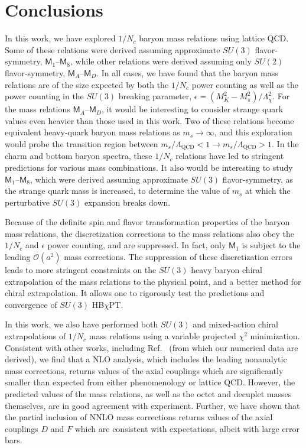 \documentclass[twocolumn,nofootinbib,prd,aps,superscriptaddress,tightenlines]{revtex4}
\def\mreln{ \mathsf{M} }
\def\mc#1{{\mathcal{#1}}}
\def\L{\Lambda}
\begin{document}
%
\section{Conclusions}
%
In this work, we have explored $1/N_c$ baryon mass relations using lattice QCD.  Some of these relations were derived assuming approximate $SU(3)$ flavor-symmetry, $\mreln_1$--$\mreln_8$, while other relations were derived assuming  only $SU(2)$ flavor-symmetry, $\mreln_A$--$\mreln_D$.  In all cases, we have found that the baryon mass relations are of the size expected by both the $1/N_c$ power counting as well as the power counting in the $SU(3)$ breaking parameter, $\epsilon = (M_K^2 - M_\pi^2) / \L_\chi^2$.  For the mass relations $\mreln_A$--$\mreln_D$, it would be interesting to consider strange quark values even heavier than those used in this work.  Two of these relations become equivalent heavy-quark baryon mass relations as $m_s \rightarrow \infty$, and this exploration would probe the transition region between $m_s / \L_{\text{QCD}}  < 1 \longrightarrow m_s / \L_{\text{QCD}} > 1$.  In the charm and bottom baryon spectra, these $1/N_c$ relations have led to stringent predictions for various mass combinations.  It also would be interesting to study $\mreln_1$--$\mreln_8$, which were derived assuming approximate $SU(3)$ flavor-symmetry, as the strange quark mass is increased, to determine the value of $m_s$ at which the perturbative $SU(3)$ expansion breaks down.

Because of the definite spin and flavor transformation properties of the baryon mass relations, the discretization corrections to the mass relations also obey the $1/N_c$ and $\epsilon$ power counting, and are suppressed.  In fact, only $\mreln_1$ is subject to the leading $\mc{O}(a^2)$ mass corrections.  The suppression of these discretization errors leads to more stringent constraints on the $SU(3)$ heavy baryon chiral extrapolation of the mass relations to the physical point, and a better method for chiral extrapolation.  It allows one to rigorously test the predictions and convergence of $SU(3)$ HB$\chi$PT.

In this work, we also have performed both $SU(3)$ and mixed-action chiral extrapolations of $1/N_c$ mass relations using a variable projected $\chi^2$ minimization.  Consistent with other works, including Ref.~\cite{WalkerLoud:2008bp} (from which our numerical data are derived), we find that a NLO analysis, which includes the leading nonanalytic mass corrections, returns values of the axial couplings which are significantly smaller than expected from either phenomenology or lattice QCD.  However, the predicted values of the mass relations, as well as the octet and decuplet masses themselves, are in good agreement with experiment.  Further, we have shown that the partial inclusion of NNLO mass corrections returns values of the axial couplings $D$ and $F$ which are consistent with expectations, albeit with large error bars.  
\end{document}
